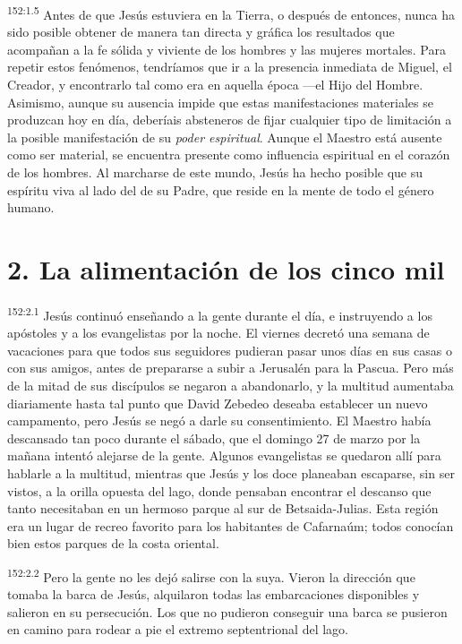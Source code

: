 \par 
\textsuperscript{152:1.5} Antes de que Jesús estuviera en la Tierra, o después de entonces, nunca ha sido posible obtener de manera tan directa y gráfica los resultados que acompañan a la fe sólida y viviente de los hombres y las mujeres mortales. Para repetir estos fenómenos, tendríamos que ir a la presencia inmediata de Miguel, el Creador, y encontrarlo tal como era en aquella época ---el Hijo del Hombre. Asimismo, aunque su ausencia impide que estas manifestaciones materiales se produzcan hoy en día, deberíais absteneros de fijar cualquier tipo de limitación a la posible manifestación de su \textit{poder espiritual}. Aunque el Maestro está ausente como ser material, se encuentra presente como influencia espiritual en el corazón de los hombres. Al marcharse de este mundo, Jesús ha hecho posible que su espíritu viva al lado del de su Padre, que reside en la mente de todo el género humano.

\section*{2. La alimentación de los cinco mil}
\par 
\textsuperscript{152:2.1} Jesús continuó enseñando a la gente durante el día, e instruyendo a los apóstoles y a los evangelistas por la noche. El viernes decretó una semana de vacaciones para que todos sus seguidores pudieran pasar unos días en sus casas o con sus amigos, antes de prepararse a subir a Jerusalén para la Pascua. Pero más de la mitad de sus discípulos se negaron a abandonarlo, y la multitud aumentaba diariamente hasta tal punto que David Zebedeo deseaba establecer un nuevo campamento, pero Jesús se negó a darle su consentimiento. El Maestro había descansado tan poco durante el sábado, que el domingo 27 de marzo por la mañana intentó alejarse de la gente. Algunos evangelistas se quedaron allí para hablarle a la multitud, mientras que Jesús y los doce planeaban escaparse, sin ser vistos, a la orilla opuesta del lago, donde pensaban encontrar el descanso que tanto necesitaban en un hermoso parque al sur de Betsaida-Julias. Esta región era un lugar de recreo favorito para los habitantes de Cafarnaúm; todos conocían bien estos parques de la costa oriental.

\par 
\textsuperscript{152:2.2} Pero la gente no les dejó salirse con la suya. Vieron la dirección que tomaba la barca de Jesús, alquilaron todas las embarcaciones disponibles y salieron en su persecución. Los que no pudieron conseguir una barca se pusieron en camino para rodear a pie el extremo septentrional del lago.

